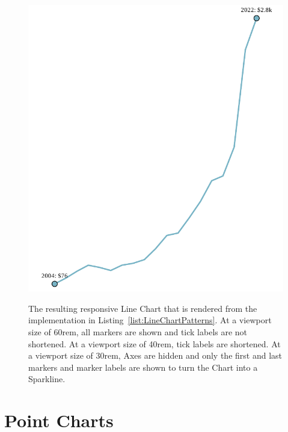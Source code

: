 \begin{figure}[tp]
{  \includegraphics[valign=b,scale=\respscale]{diagrams/respvis-line-30rem.pdf}%
  \label{fig:LineChartPatterns30rem}%
}
\caption[Responsive RespVis Line Chart]{%
The resulting responsive Line Chart that is rendered from the
implementation in Listing~\ref{list:LineChartPatterns}.
 At a viewport size of 60rem, all
markers are shown and tick labels are not shortened.
 At a viewport size of 40rem, tick
labels are shortened.   At a
viewport size of 30rem, Axes are hidden and only the first and last
markers and marker labels are shown to turn the Chart into a
Sparkline.
}
\label{fig:LineChartPatterns}
\end{figure}









\section{Point Charts}
\label{sec:PointChartsUsage}

